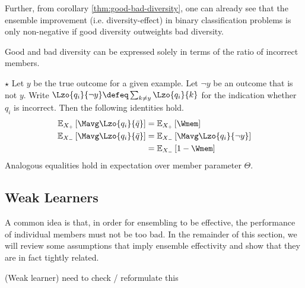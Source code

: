 \documentclass[../main.tex]{subfiles}
\begin{document}
Further, from corollary \ref{thm:good-bad-diversity}, one can already see that the ensemble improvement (i.e. diversity-effect) in binary classification problems is only non-negative if good diversity outweights bad diversity.


Good and bad diversity can be expressed solely in terms of the ratio of incorrect members. 
\begin{lemma} 
    \label{thm:good-bad-diversity-W}
    $\star$ Let $y$ be the true outcome for a given example. Let $\neg y$ be an outcome that is not $y$. Write $\Lzo{q_i}{\neg y} \defeq \sum_{k \not= y} \Lzo{q_i}{k}$ for the indication whether $q_i$ is incorrect. Then the following identities hold.
\begin{align*}
\mathbb{E}_{X_{+}}\left[ \Mavg \Lzo{q_{i}}{\bar{q}} \right] &=
\mathbb{E}_{X_{+}}\left[ \Wmem \right]   \\
\mathbb{E}_{X_{-}}\left[ \Mavg \Lzo{q_{i}}{\bar{q}} \right]  &= \mathbb{E}_{X_{-}}\left[ \Mavg  \Lzo{q_{i}}{\neg y} \right]  \\
&=
\mathbb{E}_{X_{-}}\left[ 1 - \Wmem \right]
\end{align*}
Analogous equalities hold in expectation over member parameter $\Theta$.
\end{lemma}

\subsection{Weak Learners}

A common idea is that, in order for ensembling to be effective, the performance of individual members must not be too bad. In the remainder of this section, we will review some assumptions that imply ensemble effectivity and show that they are in fact tightly related.

\begin{definition} 
   \label{def:weak-learner}  (Weak learner)
    need to check / reformulate this
\end{definition}
\end{document}

